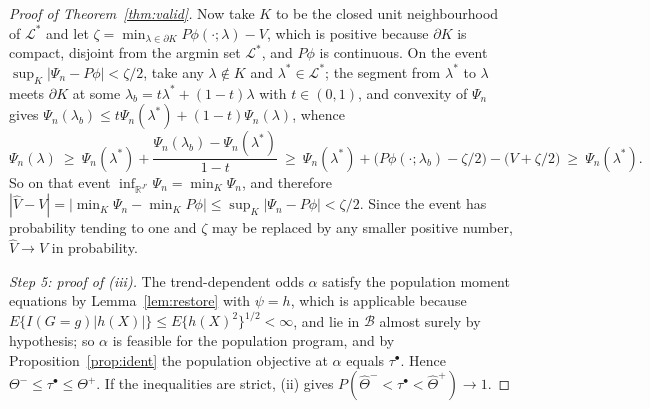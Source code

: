 \documentclass[12pt]{article}
\theoremstyle{remark}
\begin{document}
\begin{proof}[Proof of Theorem~\ref{thm:valid}]
Now take $K$ to be the closed unit neighbourhood of $\mathcal{L}^*$ and let $\zeta =
\min_{\lambda \in \partial K} P\phi(\cdot;\lambda) - V$, which is positive because $\partial K$
is compact, disjoint from the argmin set $\mathcal{L}^*$, and $P\phi$ is continuous. On the
event $\sup_K|\Psi_n - P\phi| < \zeta/2$, take any $\lambda \notin K$ and $\lambda^* \in
\mathcal{L}^*$; the segment from $\lambda^*$ to $\lambda$ meets $\partial K$ at some
$\lambda_b = t\lambda^* + (1{-}t)\lambda$ with $t \in (0,1)$, and convexity of $\Psi_n$
gives $\Psi_n(\lambda_b) \le t\Psi_n(\lambda^*) + (1{-}t)\Psi_n(\lambda)$, whence
\[
\Psi_n(\lambda) \ \ge\ \Psi_n(\lambda^*) + \frac{\Psi_n(\lambda_b) - \Psi_n(\lambda^*)}{1-t}
\ \ge\ \Psi_n(\lambda^*) + \big(P\phi(\cdot;\lambda_b) - \zeta/2\big) - \big(V + \zeta/2\big)
\ \ge\ \Psi_n(\lambda^*).
\]
So on that event $\inf_{\mathbb{R}^{J'}}\Psi_n = \min_K \Psi_n$, and therefore
$|\widehat V - V| = |\min_K\Psi_n - \min_K P\phi| \le \sup_K|\Psi_n - P\phi| < \zeta/2$.
Since the event has probability tending to one and $\zeta$ may be replaced by any smaller
positive number, $\widehat V \to V$ in probability.

\emph{Step 5: proof of (iii).} The trend-dependent odds $\alpha$ satisfy the population
moment equations by Lemma~\ref{lem:restore} with $\psi = h$, which is applicable because
$E\{I(G{=}g)|h(X)|\} \le E\{h(X)^2\}^{1/2} < \infty$, and lie in $\mathcal{B}$ almost
surely by hypothesis; so $\alpha$ is feasible for the population program, and by
Proposition~\ref{prop:ident} the population objective at $\alpha$ equals $\tau^\bullet$.
Hence $\Theta^- \le \tau^\bullet \le \Theta^+$. If the inequalities are strict, (ii) gives
$P(\widehat\Theta^- < \tau^\bullet < \widehat\Theta^+) \to 1$.


\end{proof}
\end{document}
